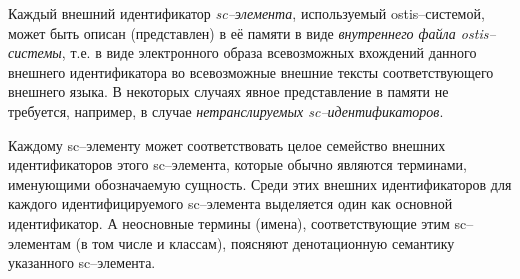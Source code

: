 Каждый внешний идентификатор \textit{sc--элемента}, используемый ostis--системой, может быть описан (представлен) в её памяти в виде \textit{внутреннего файла ostis--системы}, т.е. в виде электронного образа всевозможных вхождений данного внешнего идентификатора во всевозможные внешние тексты соответствующего внешнего языка. В некоторых случаях явное представление в памяти не требуется, например, в случае \textit{нетранслируемых sc--идентификаторов}.

Каждому sc--элементу может соответствовать целое семейство внешних идентификаторов этого sc--элемента, которые обычно являются терминами, именующими обозначаемую сущность. Среди этих внешних идентификаторов для каждого идентифицируемого sc--элемента выделяется один как основной идентификатор.
А неосновные термины (имена), соответствующие этим sc--элементам (в том числе и классам), поясняют денотационную семантику указанного sc--элемента.

